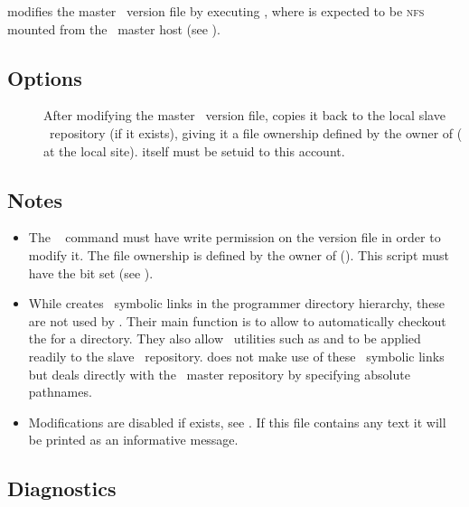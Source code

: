  modifies the master \rcs\ version file by executing
, where  is expected to be
\textsc{nfs} mounted from the \aipspp\ master host (see
).

\subsection*{Options}

\begin{description}
\item[]
   After modifying the master \rcs\ version file,  copies it back to
   the local slave \rcs\ repository (if it exists), giving it a file
   ownership defined by the owner of  ( at the local
   site).   itself must be setuid to this account.
\end{description}

\subsection*{Notes}

\begin{itemize}
\item
   The \rcs\  command must have write permission on the version
   file in order to modify it.  The file ownership is defined by the owner of
    ().  This script must have the
    bit set (see ).

\item
   While  creates \rcs\ symbolic links in the programmer
   directory hierarchy, these are not used by .  Their main function
   is to allow  to automatically checkout the 
   for a directory.  They also allow \rcs\ utilities such as  and
    to be applied readily to the slave \rcs\ repository.
    does not make use of these \rcs\ symbolic links but deals directly
   with the \aipspp\ master repository by specifying absolute pathnames.

\item
   Modifications are disabled if  exists, see
   .  If this file contains any text it will be printed as an
   informative message.
\end{itemize}

\subsection*{Diagnostics}

